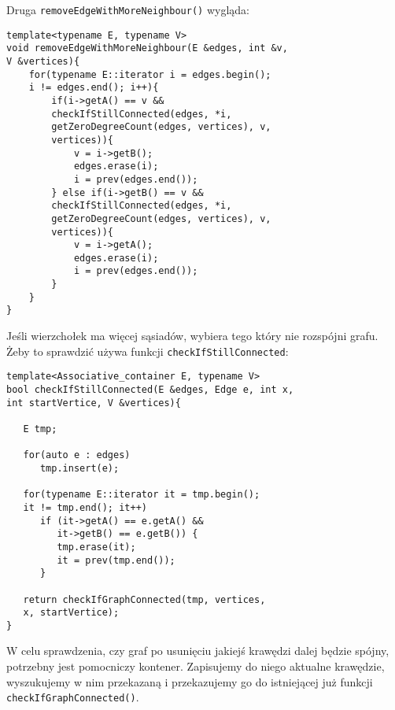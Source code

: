\documentclass[11pt, a4paper]{article}
\begin{document}
Druga \verb#removeEdgeWithMoreNeighbour()# wygląda:
\begin{lstlisting}[frame=single]
template<typename E, typename V>
void removeEdgeWithMoreNeighbour(E &edges, int &v,
V &vertices){
    for(typename E::iterator i = edges.begin(); 
    i != edges.end(); i++){
        if(i->getA() == v && 
        checkIfStillConnected(edges, *i, 
        getZeroDegreeCount(edges, vertices), v, 
        vertices)){
            v = i->getB();
            edges.erase(i);
            i = prev(edges.end());
        } else if(i->getB() == v && 
        checkIfStillConnected(edges, *i, 
        getZeroDegreeCount(edges, vertices), v, 
        vertices)){
            v = i->getA();
            edges.erase(i);
            i = prev(edges.end());
        }
    }
}
\end{lstlisting}
\newpage
Jeśli wierzchołek ma więcej sąsiadów, wybiera tego który nie rozspójni grafu. Żeby to sprawdzić używa funkcji \verb#checkIfStillConnected#:
\begin{lstlisting}[frame=single]
template<Associative_container E, typename V>
bool checkIfStillConnected(E &edges, Edge e, int x, 
int startVertice, V &vertices){
    
   E tmp;

   for(auto e : edges)
      tmp.insert(e);

   for(typename E::iterator it = tmp.begin(); 
   it != tmp.end(); it++)
      if (it->getA() == e.getA() && 
         it->getB() == e.getB()) {
         tmp.erase(it);
         it = prev(tmp.end());
      }
        
   return checkIfGraphConnected(tmp, vertices, 
   x, startVertice);
}
\end{lstlisting}

W celu sprawdzenia, czy graf po usunięciu jakiejś krawędzi dalej będzie spójny, potrzebny jest pomocniczy kontener. Zapisujemy do niego aktualne krawędzie, wyszukujemy w nim przekazaną i przekazujemy go do istniejącej już funkcji \verb#checkIfGraphConnected()#.
\end{document}
